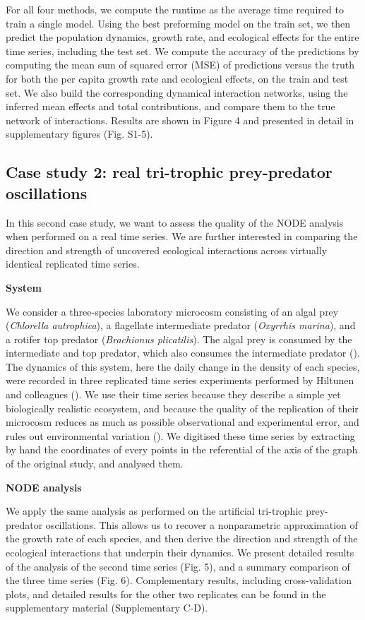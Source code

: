 \documentclass[11pt, oneside]{article}
\begin{document}
For all four methods, we compute the runtime as the average time required to train a single model.
Using the best preforming model on the train set, we then predict the population dynamics, growth rate, and ecological effects for the entire time series, including the test set.
We compute the accuracy of the predictions by computing the mean sum of squared error (MSE) of predictions versus the truth for both the per capita growth rate and ecological effects, on the train and test set.
We also build the corresponding dynamical interaction networks, using the inferred mean effects and total contributions, and compare them to the true network of interactions.
Results are shown in Figure 4 and presented in detail in supplementary figures (Fig. S1-5).

\subsection{Case study 2: real tri-trophic prey-predator oscillations}

In this second case study, we want to assess the quality of the NODE analysis when performed on a real time series.
We are further interested in comparing the direction and strength of uncovered ecological interactions across virtually identical replicated time series.

\textbf{System}

We consider a three-species laboratory microcosm consisting of an algal prey (\textit{Chlorella autrophica}), a flagellate intermediate predator (\textit{Oxyrrhis marina}), and a rotifer top predator (\textit{Brachionus plicatilis}).
The algal prey is consumed by the intermediate and top predator, which also consumes the intermediate predator (\cite{Arndt1993}).
The dynamics of this system, here the daily change in the density of each species, were recorded in three replicated time series experiments performed by Hiltunen and colleagues (\cite{Hiltunen2013}). 
We use their time series because they describe a simple yet biologically realistic ecosystem, and because the quality of the replication of their microcosm reduces as much as possible observational and experimental error, and rules out environmental variation (\cite{Hiltunen2013}).
We digitised these time series by extracting by hand the coordinates of every points in the referential of the axis of the graph of the original study, and analysed them.

\textbf{NODE analysis}

We apply the same analysis as performed on the artificial tri-trophic prey-predator oscillations.
This allows us to recover a nonparametric approximation of the growth rate of each species, and then derive the direction and strength of the ecological interactions that underpin their dynamics.
We present detailed results of the analysis of the second time series (Fig. 5), and a summary comparison of the three time series (Fig. 6).
Complementary results, including cross-validation plots, and detailed results for the other two replicates can be found in the supplementary material (Supplementary C-D).
\end{document}
